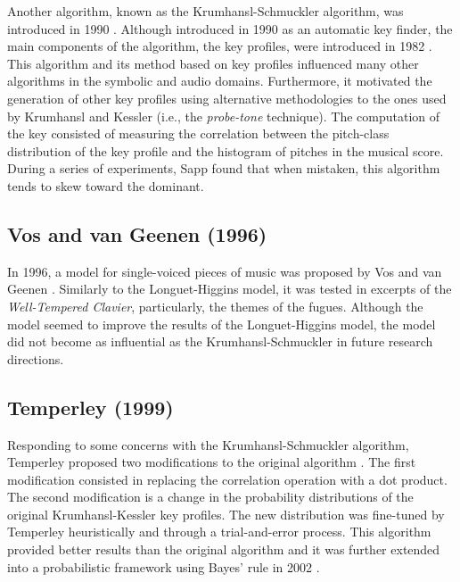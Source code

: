Another algorithm, known as the Krumhansl-Schmuckler algorithm, was introduced in 1990 \cite{krumhansl1990cognitive}. Although introduced in 1990 as an automatic key finder, the main components of the algorithm, the key profiles, were introduced in 1982 \cite{krumhansl1982tracing}. This algorithm and its method based on key profiles influenced many other algorithms in the symbolic and audio domains. Furthermore, it motivated the generation of other key profiles using alternative methodologies to the ones used by Krumhansl and Kessler (i.e., the \emph{probe-tone} technique). The computation of the key consisted of measuring the correlation between the pitch-class distribution of the key profile and the histogram of pitches in the musical score. During a series of experiments, Sapp \cite{sapp2011computational} found that when mistaken, this algorithm tends to skew toward the dominant.

\subsection{Vos and van Geenen (1996)}


In 1996, a model for single-voiced pieces of music was proposed by Vos and van Geenen \cite{vos1996parallelprocessing}. Similarly to the Longuet-Higgins model, it was tested in excerpts of the \emph{Well-Tempered Clavier}, particularly, the themes of the fugues. Although the model seemed to improve the results of the Longuet-Higgins model, the model did not become as influential as the Krumhansl-Schmuckler in future research directions.


\subsection{Temperley (1999)}

Responding to some concerns with the Krumhansl-Schmuckler algorithm, Temperley proposed two modifications to the original algorithm \cite{temperley1999whats}. The first modification consisted in replacing the correlation operation with a dot product. The second modification is a change in the probability distributions of the original Krumhansl-Kessler key profiles. The new distribution was fine-tuned by Temperley heuristically and through a trial-and-error process. This algorithm provided better results than the original algorithm and it was further extended into a probabilistic framework using Bayes' rule in 2002 \cite{temperley2002bayesian}.

